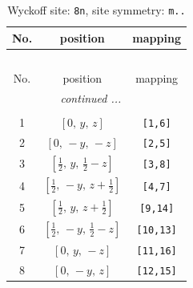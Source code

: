 \documentclass[fleqn,8pt]{jsarticle}
\begin{document}
\begin{longtable}{ccc}
\caption{Wyckoff site: {\tt 8n}, site symmetry: {\tt m..}}
 \\
 \hline \hline
No. & position & mapping \\ \hline \endfirsthead

\multicolumn{2}{l}{\tablename\ \thetable{}} \\
 \hline \hline
No. & position & mapping \\ \hline \endhead

 \hline \hline
\multicolumn{2}{r}{\footnotesize\it continued ...} \\ \endfoot

 \hline \hline
\multicolumn{2}{r}{} \\ \endlastfoot

1 & $\left[ 0,\, y,\, z \right]$ & {\tt [1,6]} \\ \hline
2 & $\left[ 0,\, - y,\, - z \right]$ & {\tt [2,5]} \\ \hline
3 & $\left[ \frac{1}{2},\, y,\, \frac{1}{2} - z \right]$ & {\tt [3,8]} \\ \hline
4 & $\left[ \frac{1}{2},\, - y,\, z + \frac{1}{2} \right]$ & {\tt [4,7]} \\ \hline
5 & $\left[ \frac{1}{2},\, y,\, z + \frac{1}{2} \right]$ & {\tt [9,14]} \\ \hline
6 & $\left[ \frac{1}{2},\, - y,\, \frac{1}{2} - z \right]$ & {\tt [10,13]} \\ \hline
7 & $\left[ 0,\, y,\, - z \right]$ & {\tt [11,16]} \\ \hline
8 & $\left[ 0,\, - y,\, z \right]$ & {\tt [12,15]} \\
\end{longtable}
\renewcommand{\arraystretch}{1.2}
\end{document}
